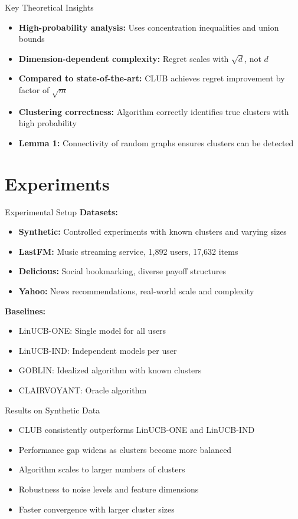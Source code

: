 \documentclass[11pt]{beamer}
\begin{document}
\begin{frame}{Key Theoretical Insights}
  \begin{itemize}
    \item \textbf{High-probability analysis:} Uses concentration inequalities and union bounds
    \item \textbf{Dimension-dependent complexity:} Regret scales with $\sqrt{d}$, not $d$
    \item \textbf{Compared to state-of-the-art:} CLUB achieves regret improvement by factor of $\sqrt{m}$
    \item \textbf{Clustering correctness:} Algorithm correctly identifies true clusters with high probability
    \item \textbf{Lemma 1:} Connectivity of random graphs ensures clusters can be detected
  \end{itemize}
\end{frame}

\section{Experiments}

\begin{frame}{Experimental Setup}
  \textbf{Datasets:}
  \begin{itemize}
    \item \textbf{Synthetic:} Controlled experiments with known clusters and varying sizes
    \item \textbf{LastFM:} Music streaming service, 1,892 users, 17,632 items
    \item \textbf{Delicious:} Social bookmarking, diverse payoff structures
    \item \textbf{Yahoo:} News recommendations, real-world scale and complexity
  \end{itemize}
  
  \textbf{Baselines:}
  \begin{itemize}
    \item LinUCB-ONE: Single model for all users
    \item LinUCB-IND: Independent models per user
    \item GOBLIN: Idealized algorithm with known clusters
    \item CLAIRVOYANT: Oracle algorithm
  \end{itemize}
\end{frame}

\begin{frame}{Results on Synthetic Data}
  \begin{itemize}
    \item CLUB consistently outperforms LinUCB-ONE and LinUCB-IND
    \item Performance gap widens as clusters become more balanced
    \item Algorithm scales to larger numbers of clusters
    \item Robustness to noise levels and feature dimensions
    \item Faster convergence with larger cluster sizes
  \end{itemize}
\end{frame}
\end{document}
